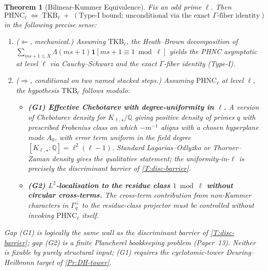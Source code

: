 \documentclass[11pt]{article}
\newtheorem{theorem}{Theorem}
\newcommand{\Q}{\mathbb Q}
\newcommand{\1}{\mathbf 1}
\begin{document}
\begin{theorem}[Bilinear-Kummer Equivalence]\label{T:phnc-tkb}
Fix an odd prime \(\ell\).  Then
\[
\mathrm{PHNC}_\ell\;\Longleftrightarrow\;\mathrm{TKB}_\ell\;+\;(\text{Type-I bound; unconditional via the exact }\Gamma\text{-fiber identity})
\]
in the following precise sense:
\begin{enumerate}[leftmargin=2em,label=(\arabic*)]
\item \emph{(\(\Leftarrow\), mechanical.)}  Assuming \(\mathrm{TKB}_\ell\), the Heath--Brown decomposition of \(\sum_{ms+1\le X}\Lambda(ms+1)\1[ms+1\equiv 1\bmod\ell]\) yields the PHNC asymptotic at level \(\ell\) via Cauchy--Schwarz and the exact \(\Gamma\)-fiber identity (Type-I).
\item \emph{(\(\Rightarrow\), conditional on two named stacked steps.)}  Assuming \(\mathrm{PHNC}_\ell\) at level \(\ell\), the hypothesis \(\mathrm{TKB}_\ell\) follows modulo:
\begin{itemize}[leftmargin=2em]
\item \textbf{(G1) Effective Chebotarev with degree-uniformity in \(\ell\).}  A version of Chebotarev density for \(K_{\ell,\star}/\Q\) giving positive density of primes \(q\) with prescribed Frobenius class on which \(-m^{-1}\) aligns with a chosen hyperplane mode \(A_0\), with error term uniform in the field degree \([K_{\ell,\star}:\Q]=\ell^2(\ell-1)\).  Standard Lagarias--Odlyzko or Thorner--Zaman density gives the qualitative statement; the uniformity-in-\(\ell\) is precisely the discriminant barrier of \cref{T:disc-barrier}.
\item \textbf{(G2) \(L^2\)-localisation to the residue class \(1\bmod\ell\) without circular cross-terms.}  The cross-term contribution from non-Kummer characters in \(\Gamma_q^\perp\) to the residue-class projector must be controlled without invoking \(\mathrm{PHNC}_\ell\) itself.
\end{itemize}
\end{enumerate}
Gap (G1) is logically the same wall as the discriminant barrier of \cref{T:disc-barrier}; gap (G2) is a finite Plancherel bookkeeping problem (Paper~13).  Neither is fixable by purely structural input; (G1) requires the cyclotomic-tower Deuring--Heilbronn target of \cref{Pr:DH-tower}.
\end{theorem}
\end{document}
